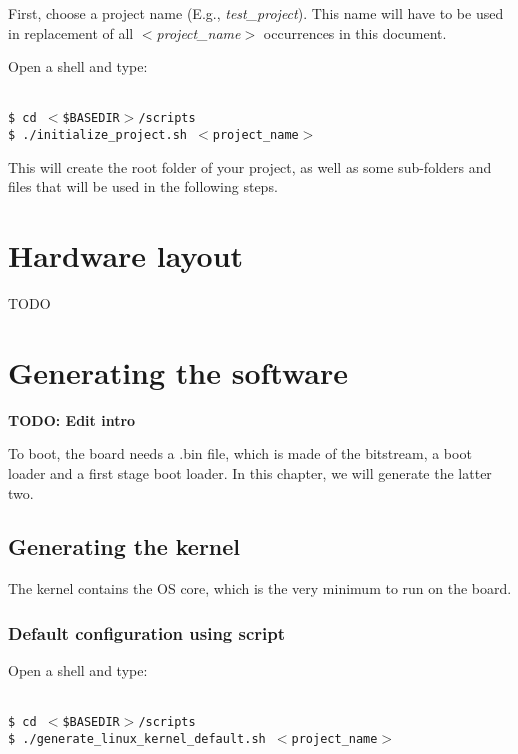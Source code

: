 \documentclass[openany,a4paper]{book}
\begin{document}
First, choose a project name (E.g., \textit{test\_project}).
This name will have to be used in replacement of all \textit{$<$project\_name$>$} occurrences in this document.

Open a shell and type:
\begin{tabbing}
\kill \hspace{1cm} \= \\
\> \texttt{\$ cd $<$\$BASEDIR$>$/scripts}\\
\> \texttt{\$ ./initialize\_project.sh $<$project\_name$>$}\\
\end{tabbing}

This will create the root folder of your project, as well as some sub-folders and files that will be used in the following steps.



\chapter{Hardware layout}



TODO


\chapter{Generating the software}

\textbf{TODO: Edit intro}

To boot, the board needs a .bin file, which is made of the bitstream, a boot loader and a first stage boot loader.
In this chapter, we will generate the latter two.

\section{Generating the kernel}

The kernel contains the OS core, which is the very minimum to run on the board.

\subsection{Default configuration using script}

Open a shell and type:

\begin{tabbing}
\kill \hspace{1cm} \= \\
\> \texttt{\$ cd $<$\$BASEDIR$>$/scripts} \\
\> \texttt{\$ ./generate\_linux\_kernel\_default.sh $<$project\_name$>$}\\
\end{tabbing}
\end{document}
